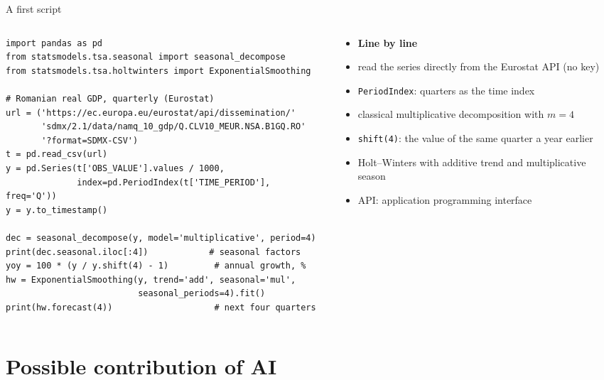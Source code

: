 \begin{frame}[fragile]{A first script}
\itemsize{\scriptsize}
\begin{columns}[T]
\begin{column}{0.62\textwidth}
\begin{lstlisting}
import pandas as pd
from statsmodels.tsa.seasonal import seasonal_decompose
from statsmodels.tsa.holtwinters import ExponentialSmoothing

# Romanian real GDP, quarterly (Eurostat)
url = ('https://ec.europa.eu/eurostat/api/dissemination/'
       'sdmx/2.1/data/namq_10_gdp/Q.CLV10_MEUR.NSA.B1GQ.RO'
       '?format=SDMX-CSV')
t = pd.read_csv(url)
y = pd.Series(t['OBS_VALUE'].values / 1000,
              index=pd.PeriodIndex(t['TIME_PERIOD'], freq='Q'))
y = y.to_timestamp()

dec = seasonal_decompose(y, model='multiplicative', period=4)
print(dec.seasonal.iloc[:4])            # seasonal factors
yoy = 100 * (y / y.shift(4) - 1)         # annual growth, %
hw = ExponentialSmoothing(y, trend='add', seasonal='mul',
                          seasonal_periods=4).fit()
print(hw.forecast(4))                    # next four quarters
\end{lstlisting}
\end{column}
\begin{column}{0.35\textwidth}
\begin{itemize}
    \item \textbf{Line by line}
    \item read the series directly from the Eurostat API (no key)
    \item \texttt{PeriodIndex}: quarters as the time index
    \item classical multiplicative decomposition with $m = 4$
    \item \texttt{shift(4)}: the value of the same quarter a year earlier
    \item Holt--Winters with additive trend and multiplicative season
    \item API: application programming interface
\end{itemize}
\end{column}
\end{columns}
\end{frame}


\section{Possible contribution of AI}

